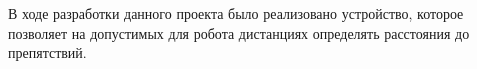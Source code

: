 
В ходе разработки данного проекта было реализовано устройство, которое позволяет на допустимых для робота дистанциях определять расстояния до препятствий.
